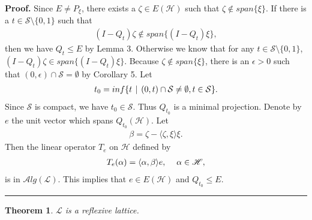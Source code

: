 \documentclass[12pt]{article}
\newtheorem{theorem}{Theorem}
\newenvironment{proof}[1][Proof]{\textbf{#1.} }{\ \rule{0.5em}{0.5em}}
\newcommand{\HHH}{\mathscr H} %
\newcommand{\LLL}{\mathscr L} %
\newcommand{\SSS}{\mathcal S}
\newcommand{\PP}[1]{ P_{#1}} %
\newcommand{\QQ}[1]{ Q_{#1}}
\def\Alg{\mathcal Alg}
\begin{document}
\noindent\begin{proof} Since $E \neq \PP {\xi}$, there exists a
$\zeta \in E(\HHH)$ such that $ \zeta \notin span \{\xi \}$. If
there is a $t \in \SSS \setminus \{0, 1 \}$ such that
\begin{align*}
(I - \QQ {t})\zeta \notin span \{(I - \QQ {t})\xi \},
\end{align*}
then we have $\QQ {t} \leq E$ by Lemma 3. Otherwise we know that for
any $t \in \SSS \setminus \{0, 1\}$, $(I - \QQ {t})\zeta \in span
\{(I - \QQ {t})\xi \}$. Because $\zeta \notin span\{ \xi \}$, there
is an $\epsilon > 0$ such that $(0, \epsilon) \cap \SSS = \emptyset$
by Corollary 5. Let
\begin{align*}
t_{0} = inf \{ t \hskip4pt |\hskip4pt (0, t) \cap \SSS \neq
\emptyset, t \in \SSS \}.
\end{align*}
Since $\SSS$ is compact, we have $t_{0} \in \SSS$. Thus $\QQ {t_0}$
is a minimal projection. Denote by $e$ the unit vector which spans
$\QQ {t_0} (\HHH)$. Let
\begin{align*}
\beta = \zeta - \langle \zeta , \xi\rangle \xi.
\end{align*}
Then the linear operator $T_e$ on $\HHH$ defined by
\begin{align*}
T_{e}(\alpha) = \langle \alpha, \beta \rangle e, \hskip12pt  \alpha
\in \HHH,
\end{align*}
is in $\Alg(\LLL)$. This implies that $e \in E(\HHH)$ and $\QQ {t_0}
\leq E$.
\end{proof}

\begin{theorem}
$\LLL$ is a reflexive lattice.
\end{theorem}
\end{document}
